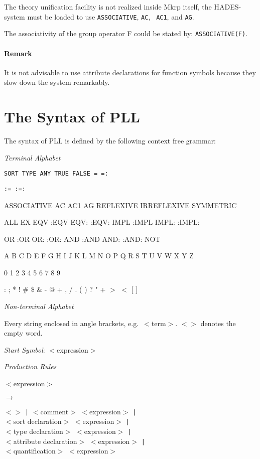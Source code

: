The theory unification facility is not realized inside {\sc Mkrp} itself, the 
HADES-system must be loaded to use {\tt ASSOCIATIVE}, {\tt AC}, {\tt
AC1}, and {\tt AG}.
\label{Attributes}


\Ex

The associativity of the group operator F 
could be stated by: \verb!ASSOCIATIVE(F)!.

\paragraph{Remark}
It is not advisable to use attribute declarations for function symbols 
because they slow down the system remarkably.


\section{The Syntax of PLL}
\label{TheSyntaxofPLL}

The syntax of PLL is defined by the following context free grammar:

{\em Terminal Alphabet\/}

{\tt SORT TYPE ANY TRUE FALSE = =:}{\tt \ }{\tt := :=:

ASSOCIATIVE AC AC1 AG REFLEXIVE IRREFLEXIVE SYMMETRIC

ALL   EX   EQV   :EQV   EQV:   :EQV:   IMPL   :IMPL   IMPL:  :IMPL:

OR   :OR   OR:   :OR:   AND   :AND   AND:   :AND:   NOT

A  B  C  D  E  F  G  H  I  J  K  L  M  N  O  P  Q  R  S  T  U  V  W  X  Y  Z

0  1  2  3  4  5  6  7  8  9

: ; * ! \# \$ \& - @ + , / . ( ) ? " + $>$ $<$ [ ]}

{\em Non-terminal Alphabet\/}

Every string enclosed in angle brackets, e.g.\ $<$term$>$.
$<$$>$ denotes the empty word.

{\em Start Symbol\/}:\quad
$<$expression$>$

\def \prule#1#2{\parbox[t]{4cm}{#1}\hfill $\rightarrow$\hfill\parbox[t]{11cm}{#2}}

\pagebreak
{\em Production Rules\/}

\prule{$<$expression$>$}%
{$<$$>$   {\tt |}   $<$comment$>$   $<$expression$>$ {\tt |} \\
$<$sort  de\-cla\-ra\-tion$>$   $<$ex\-pres\-sion$>$   {\tt |}\\
$<$type  declaration$>$   $<$expression$>$   {\tt |}\\
   $<$attribute  declaration$>$   
$<$expression$>$   {\tt |}\\
$<$quantification$>$   $<$expression$>$  }

